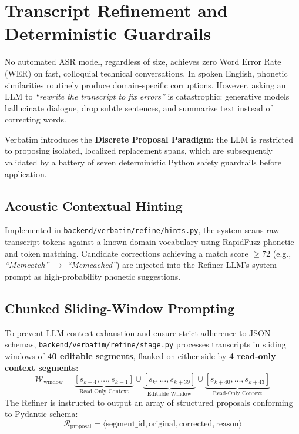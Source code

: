 \documentclass[10pt,a4paper]{article}
\begin{document}
\section{Transcript Refinement and Deterministic Guardrails}
\label{sec:refinement}

No automated ASR model, regardless of size, achieves zero Word Error Rate (WER) on fast, colloquial technical conversations. In spoken English, phonetic similarities routinely produce domain-specific corruptions. However, asking an LLM to \textit{``rewrite the transcript to fix errors''} is catastrophic: generative models hallucinate dialogue, drop subtle sentences, and summarize text instead of correcting words.

Verbatim introduces the \textbf{Discrete Proposal Paradigm}: the LLM is restricted to proposing isolated, localized replacement spans, which are subsequently validated by a battery of seven deterministic Python safety guardrails before application.

\subsection{Acoustic Contextual Hinting}
Implemented in \texttt{backend/verbatim/refine/hints.py}, the system scans raw transcript tokens against a known domain vocabulary using RapidFuzz phonetic and token matching. Candidate corrections achieving a match score $\ge 72$ (e.g., \textit{``Memcatch''} $\rightarrow$ \textit{``Memcached''}) are injected into the Refiner LLM's system prompt as high-probability phonetic suggestions.

\subsection{Chunked Sliding-Window Prompting}
To prevent LLM context exhaustion and ensure strict adherence to JSON schemas, \texttt{backend/verbatim/refine/stage.py} processes transcripts in sliding windows of \textbf{40 editable segments}, flanked on either side by \textbf{4 read-only context segments}:
\begin{equation}
\mathcal{W}_{\text{window}} = \underbrace{[s_{k-4}, \dots, s_{k-1}]}_{\text{Read-Only Context}} \cup \underbrace{[s_k, \dots, s_{k+39}]}_{\text{Editable Window}} \cup \underbrace{[s_{k+40}, \dots, s_{k+43}]}_{\text{Read-Only Context}}
\end{equation}
The Refiner is instructed to output an array of structured proposals conforming to Pydantic schema:
\begin{equation}
\mathcal{R}_{\text{proposal}} = \langle \text{segment\_id}, \text{original}, \text{corrected}, \text{reason} \rangle
\end{equation}
\end{document}
